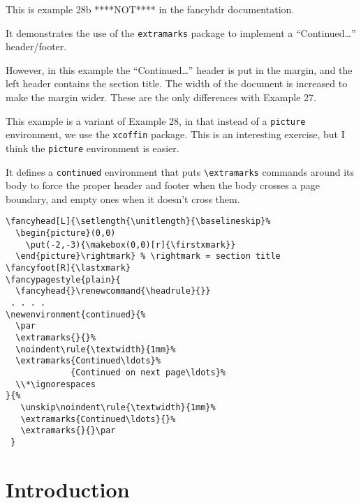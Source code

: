 \documentclass{report}
\begin{document}
\tableofcontents

\thispagestyle{plain}
\noindent
\begin{boxedminipage}{\textwidth}
This is example 28b ****NOT**** in the fancyhdr documentation.

It demonstrates the use of the \texttt{extramarks} package to implement
a ``Continued\ldots'' header/footer.

However, in this example the ``Continued\ldots'' header is put in the margin, and the left header contains the section title. The width of the document is increased to make the margin wider. These are the only differences with Example 27.

This example is a variant of Example 28, in that instead of a \texttt{picture} environment, we use the \texttt{xcoffin} package. This is an interesting exercise, but I think the \texttt{picture} environment is easier.

It defines a \texttt{continued} environment that puts \verb|\extramarks| commands around its body to force the proper header and footer when the body crosses a page boundary, and empty ones when it doesn't cross them.

\begin{verbatim}
\fancyhead[L]{\setlength{\unitlength}{\baselineskip}%
  \begin{picture}(0,0)
    \put(-2,-3){\makebox(0,0)[r]{\firstxmark}}
  \end{picture}\rightmark} % \rightmark = section title
\fancyfoot[R]{\lastxmark}
\fancypagestyle{plain}{
  \fancyhead{}\renewcommand{\headrule}{}}
 . . . .
\newenvironment{continued}{%
  \par
  \extramarks{}{}%
  \noindent\rule{\textwidth}{1mm}%
  \extramarks{Continued\ldots}%
             {Continued on next page\ldots}%
  \\*\ignorespaces
}{%
   \unskip\noindent\rule{\textwidth}{1mm}%
   \extramarks{Continued\ldots}{}%
   \extramarks{}{}\par
 }
\end{verbatim}

\end{boxedminipage}

\pagestyle{fancy}

\newpage
{}
\chapter{Introduction}

\lipsum[1-4]
\end{document}
